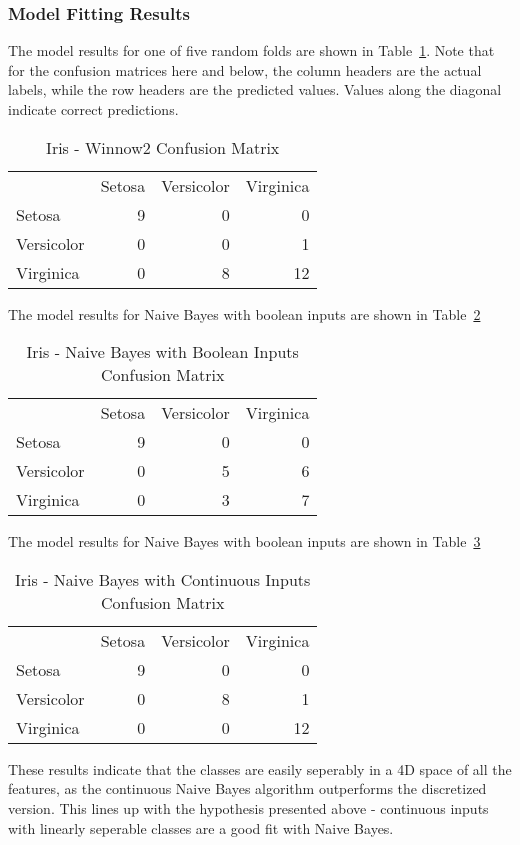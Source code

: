 \documentclass{amsart}
\begin{document}
\subsubsection*{Model Fitting Results}
    The model results for one of five random folds are shown in Table~\ref{iris_winnow2}. Note that for the confusion matrices
    here and below, the column headers are the actual labels, while the row headers are the predicted values. Values along
    the diagonal indicate correct predictions.
    \begin{table}
    \begin{tabular}{lrrr}
{} &  Setosa &  Versicolor &   Virginica \\
    Setosa &  9 &  0 &   0 \\
    Versicolor &  0 &  0 &   1 \\
    Virginica &  0 &  8 &  12
    \end{tabular}
    \caption{Iris - Winnow2 Confusion Matrix}
    \label{iris_winnow2}
    \end{table}
    The model results for Naive Bayes with boolean inputs are shown in Table~\ref{iris_nb_bool}
    \begin{table}
    \begin{tabular}{lrrr}
{} &  Setosa &  Versicolor &   Virginica \\
    Setosa &  9 &  0 &   0 \\
    Versicolor &  0 &  5 &   6 \\
    Virginica &  0 &  3 &  7
    \end{tabular}
    \caption{Iris - Naive Bayes with Boolean Inputs Confusion Matrix}
    \label{iris_nb_bool}
    \end{table}
    The model results for Naive Bayes with boolean inputs are shown in Table~\ref{iris_nb}
    \begin{table}
    \begin{tabular}{lrrr}
{} &  Setosa &  Versicolor &   Virginica \\
    Setosa &  9 &  0 &   0 \\
    Versicolor &  0 &  8 &   1 \\
    Virginica &  0 &  0 &  12
    \end{tabular}
    \caption{Iris - Naive Bayes with Continuous Inputs Confusion Matrix}
    \label{iris_nb}
    \end{table}
These results indicate that the classes are easily seperably in a 4D space of all the features, as the continuous Naive Bayes
algorithm outperforms the discretized version. This lines up with the hypothesis presented above - continuous inputs with
linearly seperable classes are a good fit with Naive Bayes.
\end{document}
